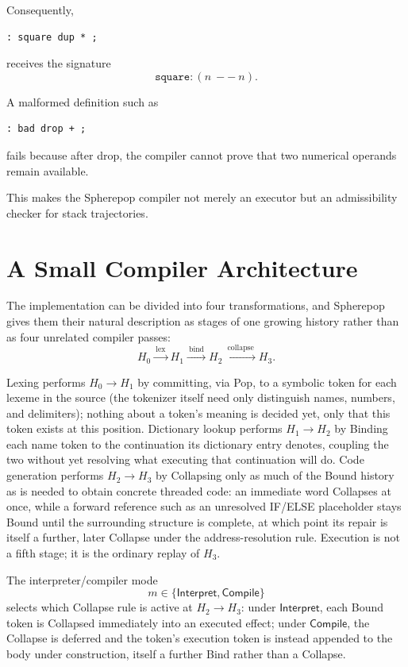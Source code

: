\documentclass[12pt]{article}
\begin{document}
Consequently,
\begin{lstlisting}
: square dup * ;
\end{lstlisting}
receives the signature
\[
\texttt{square}: (n\ --\ n).
\]

A malformed definition such as
\begin{lstlisting}
: bad drop + ;
\end{lstlisting}
fails because after drop, the compiler cannot prove that two numerical operands remain available.

This makes the Spherepop compiler not merely an executor but an admissibility checker for stack trajectories.

\section{A Small Compiler Architecture}

The implementation can be divided into four transformations, and Spherepop gives them their natural description as stages of one growing history rather than as four unrelated compiler passes:
\[
H_0 \xrightarrow{\ \mathrm{lex}\ } H_1 \xrightarrow{\ \mathrm{bind}\ } H_2 \xrightarrow{\ \mathrm{collapse}\ } H_3.
\]

Lexing performs \(H_0\to H_1\) by committing, via Pop, to a symbolic token for each lexeme in the source (the tokenizer itself need only distinguish names, numbers, and delimiters); nothing about a token's meaning is decided yet, only that this token exists at this position. Dictionary lookup performs \(H_1\to H_2\) by Binding each name token to the continuation its dictionary entry denotes, coupling the two without yet resolving what executing that continuation will do. Code generation performs \(H_2\to H_3\) by Collapsing only as much of the Bound history as is needed to obtain concrete threaded code: an immediate word Collapses at once, while a forward reference such as an unresolved IF/ELSE placeholder stays Bound until the surrounding structure is complete, at which point its repair is itself a further, later Collapse under the address-resolution rule. Execution is not a fifth stage; it is the ordinary replay of \(H_3\).

The interpreter/compiler mode
\[
m\in\{\mathsf{Interpret},\mathsf{Compile}\}
\]
selects which Collapse rule is active at \(H_2\to H_3\): under \(\mathsf{Interpret}\), each Bound token is Collapsed immediately into an executed effect; under \(\mathsf{Compile}\), the Collapse is deferred and the token's execution token is instead appended to the body under construction, itself a further Bind rather than a Collapse.
\end{document}
